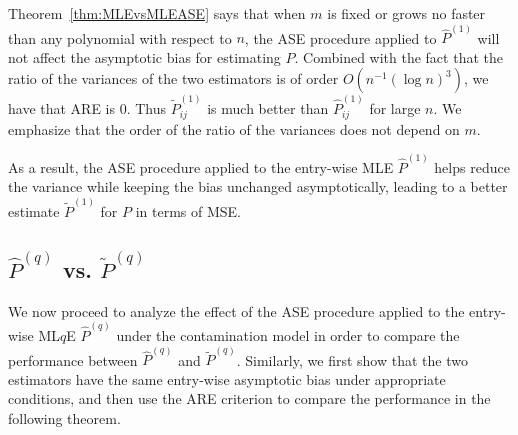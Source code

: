\documentclass[a4paper]{article}
\newtheorem{remark}[fact]{Remark}
\renewcommand{\hat}{\widehat}
\begin{document}
Theorem~\ref{thm:MLEvsMLEASE} says that when %
$m$ is fixed or grows no faster than any polynomial with respect to $n$, the ASE procedure applied to $\hat{P}^{(1)}$ will not affect the asymptotic bias for estimating $P$.
Combined with the fact that the ratio of the variances of the two estimators is of order $O(n^{-1} (\log n)^3)$, we have that ARE is 0.
Thus $\widetilde{P}_{ij}^{(1)}$ is much better than $\hat{P}_{ij}^{(1)}$ for large $n$. We emphasize that the order of the ratio of the variances does not depend on $m$.


As a result, the ASE procedure applied to the entry-wise MLE $\hat{P}^{(1)}$ helps reduce the variance while keeping the bias unchanged asymptotically, leading to a better estimate $\widetilde{P}^{(1)}$ for $P$ in terms of MSE.



\subsection{$\hat{P}^{(q)}$ vs. $\widetilde{P}^{(q)}$}

We now proceed to analyze the effect of the ASE procedure applied to the entry-wise ML$q$E $\hat{P}^{(q)}$ under the contamination model in order to compare the performance between $\hat{P}^{(q)}$ and $\widetilde{P}^{(q)}$. Similarly, we first show that the two estimators have the same entry-wise asymptotic bias under appropriate conditions, and then use the ARE criterion to compare the performance in the following theorem.
\end{document}
